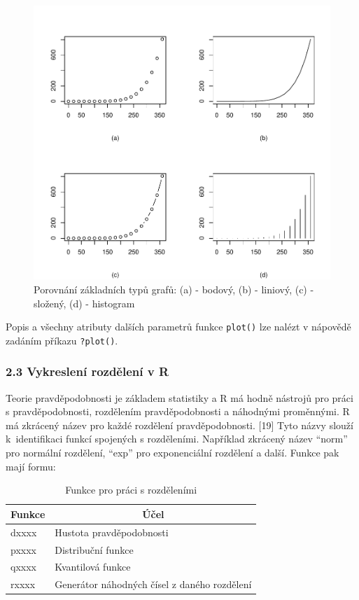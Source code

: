 \documentclass[12pt,]{article}
\begin{document}
\begin{figure}[H]

{\centering \includegraphics[width=0.8\linewidth]{BP_files/figure-latex/graf_typy-1} 

}

\caption{\label{fig1} Porovnání základních typů grafů: (a) - bodový, (b) - liniový, (c) - složený, (d) - histogram}\label{fig:graf_typy}
\end{figure}

Popis a všechny atributy dalších parametrů funkce \texttt{plot()} lze
nalézt v nápovědě zadáním příkazu \texttt{?plot()}.

\hypertarget{distribution}{\subsubsection{2.3 Vykreslení rozdělení v
R}\label{distribution}}

\qquad Teorie pravděpodobnosti je základem statistiky a R má hodně
nástrojů pro práci s pravděpodobnosti, rozdělením pravděpodobnosti a
náhodnými proměnnými. R má zkrácený název pro každé rozdělení
pravděpodobnosti. {[}19{]} Tyto názvy slouží k~identifikaci funkcí
spojených s rozděleními. Například zkrácený název \enquote{norm} pro
normální rozdělení, \enquote{exp} pro exponenciální rozdělení a další.
Funkce pak mají formu:

\begin{table}[H]
\centering
\begin{tabular}{@{}ll@{}}
\toprule
Funkce & \multicolumn{1}{c}{Účel}                     \\ \midrule
dxxxx  & Hustota pravděpodobnosti                     \\
pxxxx  & Distribuční funkce                           \\
qxxxx  & Kvantilová funkce                            \\
rxxxx  & Generátor náhodných čísel z daného rozdělení \\ \bottomrule
\end{tabular}
\caption{Funkce pro práci s rozděleními}
\label{tab2}
\end{table}
\end{document}
